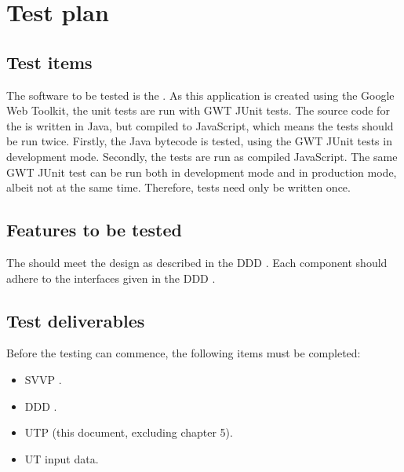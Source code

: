 \chapter{Test plan}\label{chap:testPlan}

\section{Test items}
The software to be tested is the \applicationname{}. As this application is created using the Google Web Toolkit, the unit tests are run with GWT JUnit tests. The source code for the \applicationname{} is written in Java, but compiled to JavaScript, which means the tests should be run twice. Firstly, the Java bytecode is tested, using the GWT JUnit tests in development mode. Secondly, the tests are run as compiled JavaScript. The same GWT JUnit test can be run both in development mode and in production mode, albeit not at the same time. Therefore, tests need only be written once.



\section{Features to be tested}
The \applicationname{} should meet the design as described in the DDD \cite{DDD}. Each component should adhere to the interfaces given in the DDD \cite{DDD}.

\section{Test deliverables}
Before the testing can commence, the following items must be completed:

\begin{itemize}
  \item SVVP \cite{svvp}.
  \item DDD \cite{DDD}.
  \item UTP (this document, excluding chapter 5).
  \item UT input data.
\end{itemize}

